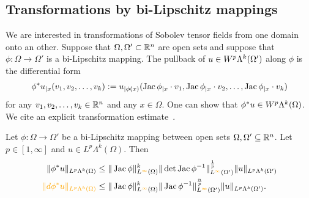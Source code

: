 \documentclass[10pt,letterpaper]{article}
\newcommand\cye[1]{%
  \protect\leavevmode
  \begingroup
    \color{red!35!yellow}%
    #1%
  \endgroup
}
\begin{document}
\subsection{\cye{Transformations by bi-Lipschitz mappings}}

We are interested in transformations of Sobolev tensor fields from one domain onto \cye{an}other. 
Suppose that $\Omega,\Omega' \subset {\mathbb R}^{n}$ are open sets and suppose that $\phi: \Omega \to \Omega'$ is a bi-Lipschitz mapping.
The pullback of $u \in W^{p}\Lambda^{k}(\Omega')$ along $\phi$ is the differential form 
\begin{align} \label{equation:pullback}
    \phi^{\ast}u_{|x}( v_{1}, v_{2}, \ldots, v_{k} ) 
    := 
    u_{|\phi(x)}( \operatorname{{\rm Jac}}\phi_{|x} \cdot v_1, \operatorname{{\rm Jac}}\phi_{|x} \cdot v_2, \ldots, \operatorname{{\rm Jac}}\phi_{|x} \cdot v_k ) 
\end{align}
for any $v_1, v_2, \dots, v_k \in {\mathbb R}^{n}$ and any $x \in \Omega$. One can show that $\phi^{\ast}u \in W^{p}\Lambda^{k}(\Omega)$.
We cite an explicit transformation estimate~\cite{licht2019smoothed}.


\begin{proposition} \label{proposition:pullbackestimate}
 Let $\phi : \Omega \rightarrow \Omega'$ be a bi-Lipschitz mapping between open sets $\Omega, \Omega' \subseteq {\mathbb R}^{n}$.
 Let $p \in [1,\infty]$ and $u \in L^{p}\Lambda^{k}(\Omega)$. 
 Then 
 \begin{align}\label{math:pullbackestimate}
  \begin{split}
  \| \phi^{\ast} u \|_{L^{p}\Lambda^{k}(\Omega)}
  &\leq 
  \| \Jacobian \phi \|^{k}_{L^{\cye{\infty}}(\Omega)}
  \| \det\Jacobian \phi^{-1} \|^{\frac{1}{p}}_{L^{\cye{\infty}}(\Omega')}
  \| u \|_{L^{p}\Lambda^{k}(\Omega')}
  \\ \cye{\| d \phi^{\ast} u \|_{L^{p}\Lambda^{k}(\Omega)}} &\leq 
  \| \Jacobian \phi \|^{k}_{L^{\cye{\infty}}(\Omega)}
  \| \Jacobian \phi^{-1} \|^{\frac{n}{p}}_{L^{\cye{\infty}}(\Omega')}
  \| u \|_{L^{p}\Lambda^{k}(\Omega')}
  .
  \end{split}
 \end{align}
\end{proposition}
\end{document}
